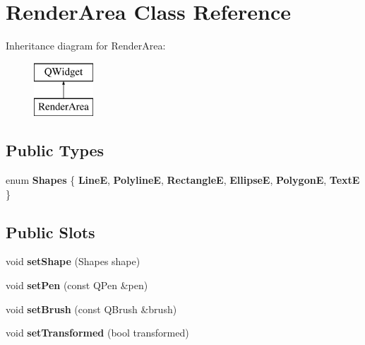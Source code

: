 \hypertarget{class_render_area}{}\section{Render\+Area Class Reference}
\label{class_render_area}
Inheritance diagram for Render\+Area\+:\begin{figure}[H]
\begin{center}
\leavevmode
\includegraphics[height=2.000000cm]{class_render_area}
\end{center}
\end{figure}
\subsection*{Public Types}
\begin{DoxyCompactItemize}
\item 
\mbox{\label{class_render_area_a45c0e3befbec666b5f7ae3beeffc9b80}} 
enum {\bfseries Shapes} \{ \newline
{\bfseries LineE}, 
{\bfseries PolylineE}, 
{\bfseries RectangleE}, 
{\bfseries EllipseE}, 
\newline
{\bfseries PolygonE}, 
{\bfseries TextE}
 \}
\end{DoxyCompactItemize}
\subsection*{Public Slots}
\begin{DoxyCompactItemize}
\item 
\mbox{\label{class_render_area_a7b0482d994c6631cd74a32a88c50a94e}} 
void {\bfseries set\+Shape} (Shapes shape)
\item 
\mbox{\label{class_render_area_a209db7987984687b05ee02e6784ad782}} 
void {\bfseries set\+Pen} (const Q\+Pen \&pen)
\item 
\mbox{\label{class_render_area_a89dbd44a79ba820ae8d651f30abc56b1}} 
void {\bfseries set\+Brush} (const Q\+Brush \&brush)
\item 
\mbox{\label{class_render_area_afe6c01e6f89bef67a2322c8245efb134}} 
void {\bfseries set\+Transformed} (bool transformed)
\end{DoxyCompactItemize}
